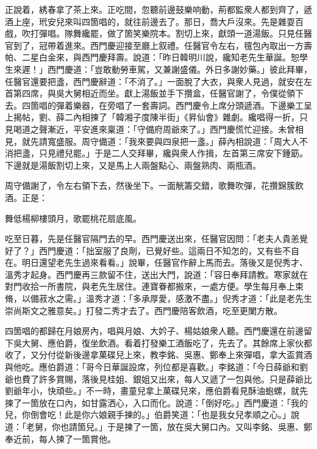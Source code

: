 正說着，綉春拿了茶上來。正吃間，忽聽前邊鼓樂响動，荊都監衆人都到齊了，遞酒上座，玳安兒來叫四箇唱的，就往前邊去了。那日，喬大戶沒來。先是雜耍百戲，吹打彈唱。隊舞纔罷，做了箇笑樂院本。割切上來，獻頭一道湯飯。只見任醫官到了，冠帶着進來。西門慶迎接至廳上叙禮。任醫官令左右，氊包內取出一方壽帕、二星白金來，與西門慶拜壽。說道：「昨日韓明川說，纔知老先生華誕。恕學生來遲！」西門慶道：「豈敢動勞車駕，又兼謝盛儀。外日多謝妙藥。」彼此拜畢，任醫官還要把盞，西門慶辭道：「不消了。」一面脫了大衣，與衆人見過，就安在左首第四席，與吳大舅相近而坐。獻上湯飯並手下攢盒，任醫官謝了，令僕從領下去。四箇唱的彈着樂器，在旁唱了一套壽詞。西門慶令上席分頭遞酒。下邊樂工呈上揭帖，劉、薛二內相揀了「韓湘子度陳半街」《昇仙會》雜劇。纔唱得一折，只見喝道之聲漸近，平安進來稟道：「守備府周爺來了。」西門慶慌忙迎接。未曾相見，就先請寬盛服。周守備道：「我來要與四泉把一盞。」薛內相說道：「周大人不消把盞，只見禮兒罷。」于是二人交拜畢，纔與衆人作揖，左首第三席安下鍾筯。下邊就是湯飯割切上來，又是馬上人兩盤點心、兩盤熟肉、兩瓶酒。

周守備謝了，令左右領下去，然後坐下。一面觥籌交錯，歌舞吹彈，花攢錦簇飲酒。正是：

\begin{myquote} 
舞低楊柳樓頭月，歌罷桃花扇底風。
\end{myquote} 

吃至日暮，先是任醫官隔門去的早。西門慶送出來，任醫官因問：「老夫人貴恙覺好了？」西門慶道：「拙室服了良劑，已覺好些。這兩日不知怎的，又有些不自在。明日還望老先生過來看看。」說畢，任醫官作辭上馬而去。落後又是倪秀才、溫秀才起身。西門慶再三款留不住，送出大門，說道：「容日奉拜請教。寒家就在對門收拾一所書院，與老先生居住。連寶眷都搬來，一處方便。學生每月奉上束脩，以備菽水之需。」溫秀才道：「多承厚愛，感激不盡。」倪秀才道：「此是老先生崇尚斯文之雅意矣。」打發二秀才去了。西門慶陪客飲酒，吃至更闌方散。

四箇唱的都歸在月娘房內，唱與月娘、大妗子、楊姑娘衆人聽。西門慶還在前邊留下吳大舅、應伯爵，復坐飲酒。看着打發樂工酒飯吃了，先去了。其餘席上家伙都收了，又分付從新後邊拿菓碟兒上來，教李銘、吳惠、鄭奉上來彈唱，拿大盃賞酒與他吃。應伯爵道：「哥今日華誕設席，列位都是喜歡。」李銘道：「今日薛爺和劉爺也費了許多賞賜，落後見桂姐、銀姐又出來，每人又遞了一包與他。只是薛爺比劉爺年小，快頑些。」不一時，畫童兒拿上菓碟兒來，應伯爵看見酥油蚫螺，就先揀了一箇放在口內，如甘露洒心，入口而化。說道：「倒好吃。」西門慶道：「我的兒，你倒會吃！此是你六娘親手揀的。」伯爵笑道：「也是我女兒孝順之心。」說道：「老舅，你也請箇兒。」于是揀了一箇，放在吳大舅口內。又叫李銘、吳惠、鄭奉近前，每人揀了一箇賞他。

